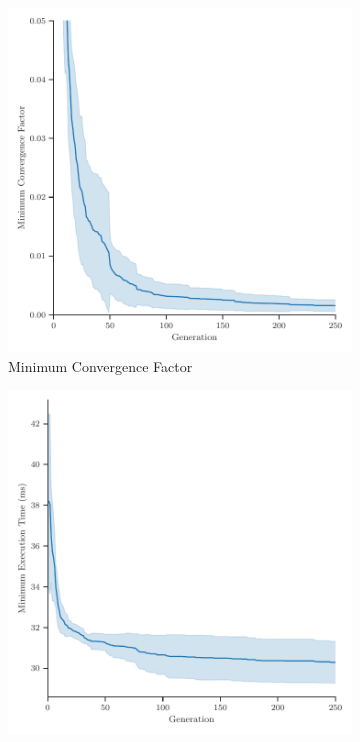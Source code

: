 \begin{figure}[h]
	\centering
	\begin{subfigure}[b]{0.49\textwidth}
		\centering
		\includegraphics[width=\textwidth]{figures/minimum_convergence_factor_2D_FD_Poisson_fromL2.pdf}
		\caption{Minimum Convergence Factor}
		\label{fig:poisson-2D-minimum-convergence-factor}
	\end{subfigure}
	\hfill
	\begin{subfigure}[b]{0.49\textwidth}
		\centering
		\includegraphics[width=\textwidth]{figures/minimum_execution_time_2D_FD_Poisson_fromL2.pdf}

\end{subfigure}
\end{figure}
